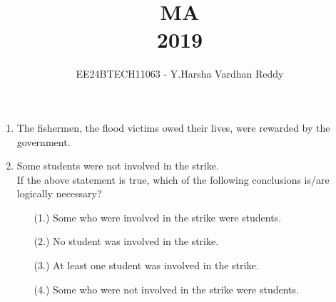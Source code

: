 \documentclass[journal,,12pt,onecolumn]{IEEEtran}
\theoremstyle{remark}
\begin{document}

\vspace{3cm}

\title{MA\\2019}
\author{EE24BTECH11063 - Y.Harsha Vardhan Reddy}
\maketitle

\bigskip

\renewcommand{\thefigure}{\theenumi}
\renewcommand{\thetable}{\theenumi}

\begin{enumerate}
\section*{Q.1 to Q.5 carry 1 mark each}
\item The fishermen, \underline{\hspace{2cm}} the flood victims owed their lives, were rewarded by the government.\\
\begin{enumerate}
\end{enumerate}

\bigskip

\item Some students were not involved in the strike.\\
If the above statement is true, which of the following conclusions is/are logically necessary?\\
\begin{enumerate}
    \item[(1.)] Some who were involved in the strike were students.
    \item[(2.)] No student was involved in the strike.
    \item[(3.)]  At least one student was involved in the strike.
    \item[(4.)] Some who were not involved in the strike were students.
\end{enumerate}
\begin{enumerate}
\end{enumerate}


\end{enumerate}
\end{document}
